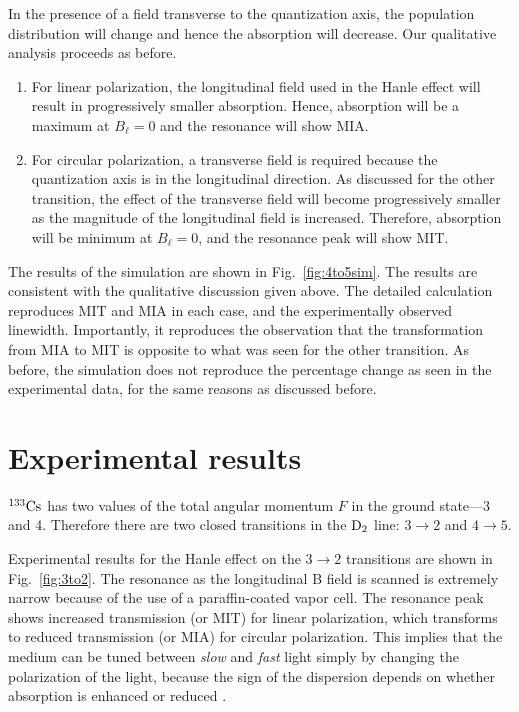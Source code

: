 In the presence of a field transverse to the quantization axis, the population distribution will change and hence the absorption will decrease. Our qualitative analysis proceeds as before. 
\begin{enumerate}
	\item For linear polarization, the longitudinal field used in the Hanle effect will result in progressively smaller absorption. Hence, absorption will be a maximum at $ B_{\ell} =0 $ and the resonance will show MIA.

\item For circular polarization, a transverse field is required because the quantization axis is in the longitudinal direction. As discussed for the other transition, the effect of the transverse field will become progressively smaller as the magnitude of the longitudinal field is increased. Therefore, absorption will be minimum at $ B_{\ell} = 0 $, and the resonance peak will show MIT.
\end{enumerate}

The results of the simulation are shown in Fig.\ \ref{fig:4to5sim}. The results are consistent with the qualitative discussion given above. The detailed calculation reproduces MIT and MIA in each case, and the experimentally observed linewidth. Importantly, it reproduces the observation that the transformation from MIA to MIT is opposite to what was seen for the other transition. As before, the simulation does not reproduce the percentage change as seen in the experimental data, for the same reasons as discussed before.

\section{Experimental results}

${\rm^{133}Cs}$ has two values of the total angular momentum $ F $ in the ground state---3 and 4. Therefore there are two closed transitions in the $\rm D_2 $ line: $ 3 \rightarrow 2 $ and $ 4 \rightarrow 5 $.

Experimental results for the Hanle effect on the $ 3 \rightarrow 2 $ transitions are shown in Fig.\ \ref{fig:3to2}. The resonance as the longitudinal B field is scanned is extremely narrow  because of the use of a paraffin-coated vapor cell. The resonance peak shows increased transmission (or MIT) for linear polarization, which transforms to reduced transmission (or MIA) for circular polarization. This implies that the medium can be tuned between \textit{slow} and \textit{fast} light simply by changing the polarization of the light, because the sign of the dispersion depends on whether absorption is enhanced or reduced \cite{BHN15}.

